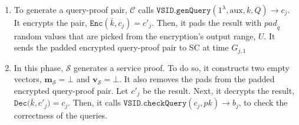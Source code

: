 \begin{enumerate}
\begin{enumerate}

\item\label{Billing-cycles-genQuery} To generate a query-proof pair, $\mathcal C$  calls $\mathtt{VSID.genQuery}(1^{\lambda},  \text{aux},k,Q)\rightarrow c_{\scriptscriptstyle j}$. It encrypts the pair, $\mathtt{Enc}(\bar{k},c_{\scriptscriptstyle j})=c'_{\scriptscriptstyle j}$. Then, it pads the result with ${pad}_{\scriptscriptstyle q}$ random values that are picked from the encryption's output range, $U$. It sends the padded encrypted query-proof pair to SC at time $G_{\scriptscriptstyle j,1}$ 




\item In this phase, $\mathcal S$ generates a service proof. To do so, it  constructs two empty  vectors, $\bm{m}_{\scriptscriptstyle\mathcal S}=\bot$ and $\bm{v}_{\scriptscriptstyle\mathcal{S}}=\bot$.  It also  removes the pads from the padded encrypted query-proof pair. Let  $c'_{\scriptscriptstyle j}$ be the result. Next, it  decrypts  the result, $\mathtt{Dec(}\bar{k},c'_{\scriptscriptstyle j})=c_{\scriptscriptstyle j}$. Then, it   calls $\mathtt{VSID.checkQuery}(c_{\scriptscriptstyle j}, pk)\rightarrow b_{\scriptscriptstyle j}$, to check the correctness of the queries.






\end{enumerate}
\end{enumerate}
